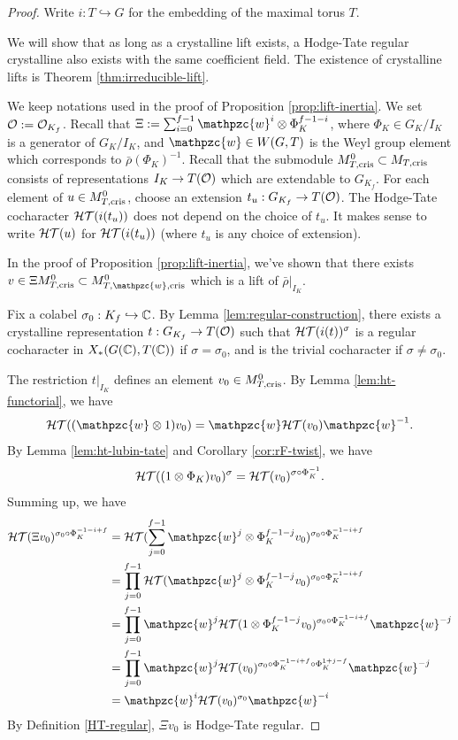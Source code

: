 \documentclass[10pt,a4paper,twoside]{article}
\begin{document}
\begin{proof}
Write $i:T\hookrightarrow G$ for the embedding of the maximal torus $T$.

We will show that as long as a crystalline lift exists, a Hodge-Tate regular crystalline also exists with the same coefficient field.
The existence of crystalline lifts is Theorem \ref{thm:irreducible-lift}.

We keep notations used in the proof of Proposition \ref{prop:lift-inertia}.
We set $\mathcal{O} := \mathcal{O}_{K_f}$.
Recall that $\Xi := \sum_{i=0}^{f-1}\mathpzc{w}^i\otimes \Phi^{f-1-i}_K$,
where $\Phi_K \in G_K/I_K$ is a generator of $G_K/I_K$, and $\mathpzc{w} \in W(G,T)$ is the Weyl group element which corresponds to $\bar\rho(\Phi_K)^{-1}$.
Recall that the submodule $M^0_{T,\operatorname{cris}} \subset M_{T,\operatorname{cris}}$
consists of representations $I_K \to T(\mathcal{O})$ which are extendable to $G_{K_f}$.
For each element of $u\in M^0_{T,\operatorname{cris}}$, choose an extension $t_u: G_{K_f} \to T(\mathcal{O})$.
The Hodge-Tate cocharacter ${\mathcal{HT}}(i(t_u))$ does not depend on the choice of $t_u$.
It makes sense to write ${\mathcal{HT}}(u)$ for ${\mathcal{HT}}(i(t_u))$ (where $t_u$ is any choice of extension).



In the proof of Proposition \ref{prop:lift-inertia}, we've shown that there exists
$v\in \Xi M^0_{T,\cris}\subset M^0_{T,\mathpzc{w},\cris}$
which is a lift of $\bar\rho|_{I_K}$.

Fix a colabel $\sigma_0: K_f \hookrightarrow {\mathbb{C}}$.
By Lemma \ref{lem:regular-construction}, there exists a crystalline representation
$t: G_{K_f} \to T(\mathcal{O})$ such that
${\mathcal{HT}}(i(t))^{\sigma}$ is a regular cocharacter in $X_*(G({\mathbb{C}}), T({\mathbb{C}}))$
if $\sigma=\sigma_0$, and is the trivial cocharacter if $\sigma\ne \sigma_0$.

The restriction $t|_{I_K}$ defines an element $v_0\in M^0_{T,\operatorname{cris}}$.
By Lemma \ref{lem:ht-functorial}, 
we have $$\hT((\mathpzc{w}\otimes 1)v_0) = \mathpzc{w}\hT(v_0)\mathpzc{w}^{-1}.$$
By Lemma \ref{lem:ht-lubin-tate} and Corollary \ref{cor:rF-twist},
we have $${\mathcal{HT}}((1\otimes \Phi_K)v_0)^{\sigma} = {\mathcal{HT}}(v_0)^{\sigma\circ \Phi_K^{-1}}.$$
Summing up, we have
\begin{align*}
\hT(\Xi v_0)^{\sigma_0 \circ \Phi_K^{-1-i+f}} & = 
\hT(\sum_{j=0}^{f-1}\mathpzc{w}^j\otimes \Phi^{f-1-j}_K v_0)^{\sigma_0 \circ \Phi_K^{-1-i+f}} \\
&=
\prod_{j=0}^{f-1}
\hT(\mathpzc{w}^j\otimes \Phi^{f-1-j}_K v_0)^{\sigma_0 \circ \Phi_K^{-1-i+f}} \\
&=
\prod_{j=0}^{f-1}
\mathpzc{w}^j\hT(1 \otimes \Phi^{f-1-j}_K v_0)^{\sigma_0 \circ \Phi_K^{-1-i+f}}\mathpzc{w}^{-j} \\
&=
\prod_{j=0}^{f-1}
\mathpzc{w}^j\hT(v_0)^{\sigma_0 \circ \Phi_K^{-1-i+f}\circ \Phi_K^{1+j-f}}\mathpzc{w}^{-j} \\
&=
\mathpzc{w}^i\hT(v_0)^{\sigma_0}\mathpzc{w}^{-i}
\end{align*}
By Definition \ref{HT-regular}, $\Xi v_0$ is Hodge-Tate regular.


\end{proof}
\end{document}
